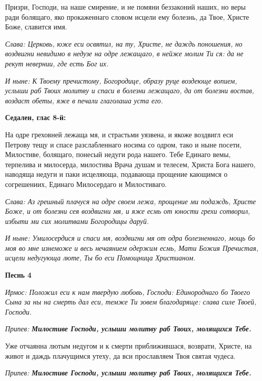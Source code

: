 Призри, Господи, на наше смирение, и не помяни беззаконий наших, но веры ради болящаго, яко прокаженнаго словом исцели ему болезнь, да Твое, Христе Боже, славится имя.

\itshape Слава: \normalfont{}Церковь, юже еси освятил, на ту, Христе, не даждь поношения, но воздвигни невидимо в недузе на одре лежащаго, в нейже молим Ти ся: да не рекут невернии, где есть Бог их.

\itshape И ныне: \normalfont{}К Твоему пречистому, Богородице, образу руце воздеюще вопием, услыши раб Твоих молитву и спаси в болезни лежащаго, да от болезни востав, воздаст обеты, яже в печали глаголаша уста его.


\medskip


\bfseries Седален, глас 8-й:\normalfont{}


На одре греховней лежаща мя, и страстьми уязвена, и якоже воздвигл еси Петрову тещу и спасе разслабленнаго носима со одром, тако и ныне посети, Милостиве, болящаго, понесый недуги рода нашего. Тебе Единаго вемы, терпелива и милосерда, милостива Врача душам и телесем, Христа Бога нашего, наводяща недуги и паки исцеляюща, подавающа прощение кающимся о согрешениих, Единаго Милосердаго и Милостиваго.

\itshape Слава: \normalfont{}Аз грешный плачуся на одре своем лежа, прощение ми подаждь, Христе Боже, и от болезни сея воздвигни мя, и яже есмь от юности грехи сотворил, избыти ми сих молитвами Богородицы даруй.

\itshape И ныне: \normalfont{}Умилосердися и спаси мя, воздвигни мя от одра болезненнаго, мощь бо моя во мне изнеможе и весь нечаянием одержим есмь, Мати Божия Пречистая, исцели недугующа люте, Ты бо еси Помощница Христианом.


\medskip


\bfseries Песнь 4\normalfont{}


\itshape Ирмос: \normalfont{}Положил еси к нам твердую любовь, Господи: Единороднаго бо Твоего Сына за ны на смерть дал еси, темже Ти зовем благодаряще: слава силе Твоей, Господи.

\itshape Припев: \normalfont{}\bfseries Милостиве Господи, услыши молитву раб Твоих, молящихся Тебе.

\normalfont{}Уже отчаянна лютым недугом и к смерти приближившася, возврати, Христе, на живот и даждь плачущимся утеху, да вси прославляем Твоя святая чудеса.

\itshape Припев: \normalfont{}\bfseries Милостиве Господи, услыши молитву раб Твоих, молящихся Тебе.

